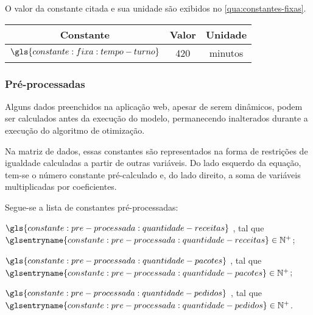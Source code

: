 O valor da constante citada e sua unidade são exibidos no \autoref{qua:constantes-fixas}.

\begin{quadro}
    \caption{%
        \label{qua:constantes-fixas}%
        Constantes do problema.
    }

    \begin{tabular}{|c|c|c|}
        \hline
        Constante                              &
        Valor                                  &
        Unidade
        \\
        \hline
        \( \gls{constante:fixa:tempo-turno} \) &
        420                                    &
        minutos
        \\
        \hline
    \end{tabular}

    \ComponenteFontePropria{}
\end{quadro}

\subsubsection{Pré-processadas}

Alguns dados preenchidos na aplicação web, apesar de serem dinâmicos, podem ser calculados antes da execução do modelo, permanecendo inalterados durante a execução do algoritmo de otimização.

Na matriz de dados, essas constantes são representados na forma de restrições de igualdade calculadas a partir de outras variáveis.
Do lado esquerdo da equação, tem-se o número constante pré-calculado e, do lado direito, a soma de variáveis multiplicadas por coeficientes.

Segue-se a lista de constantes pré-processadas:

\begin{symbols}
    \item[\( \gls{constante:pre-processada:quantidade-receitas} \)]
    ,
    tal que \( \glsentryname{constante:pre-processada:quantidade-receitas} \in \mathbb{N}^{+} \);

    \item[\( \gls{constante:pre-processada:quantidade-pacotes} \)]
    ,
    tal que \( \glsentryname{constante:pre-processada:quantidade-pacotes} \in \mathbb{N}^{+} \);

    \item[\( \gls{constante:pre-processada:quantidade-pedidos} \)]
    ,
    tal que \( \glsentryname{constante:pre-processada:quantidade-pedidos} \in \mathbb{N}^{+} \).
\end{symbols}

